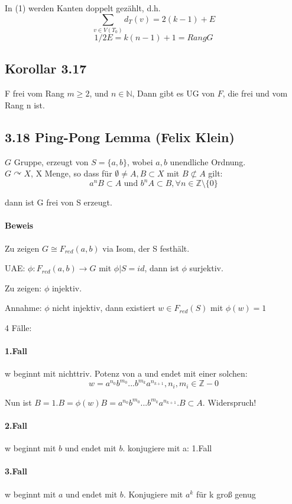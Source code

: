 \documentclass{article}
\newcommand{\N}{\mathbb{N}}
\newcommand{\Z}{\mathbb{Z}}
\begin{document}
In (1) werden Kanten doppelt gezählt, d.h.
\[\sum_{v\in V(T_0)}d_T(v) = 2(k-1) + E\]
\[1/2 E = k(n-1) + 1 = Rang G\]

\subsection{Korollar 3.17}
F frei vom Rang $m \geq 2$, und $n\in \N$, Dann gibt es UG von $F$, die frei und vom Rang n ist.

\subsection{3.18 Ping-Pong Lemma (Felix Klein)}
$G$ Gruppe, erzeugt von $S = \{a,b\}$, wobei $a,b$ unendliche Ordnung.\\
$G \curvearrowright X$, X Menge, so dass für $\emptyset \neq A, B \subset X$
mit $B \not \subset A$ gilt:
\[a^nB \subset A \text{ und } b^nA \subset B, \forall n \in \Z\setminus\{0\} \]

dann ist G frei von S erzeugt.

\paragraph{Beweis}
Zu zeigen $G \cong F_{red}(a,b)$ via Isom, der S festhält.

UAE:
$\phi : F_{red}(a,b) \longrightarrow G$ mit $\phi|S = id$, dann ist $\phi$ surjektiv.

Zu zeigen: $\phi$ injektiv.

Annahme: $\phi$ nicht injektiv, dann existiert $w\in F_{red}(S)$ mit $\phi(w) = 1$

4 Fälle: 

\paragraph{1.Fall}
w beginnt mit nichttriv. Potenz von a und endet mit einer solchen:
\[w = a^{n_0}b^{m_0}...b^{m_k}a^{n_{k+1}}, n_i, m_i \in \Z- 0 \]

Nun ist $B = 1.B = \phi(w)B = a^{n_0}b^{m_0}...b^{m_k}a^{n_{k+1}}.B \subset A$. Widerspruch!

\paragraph{2.Fall}
w beginnt mit $b$ und endet mit $b$. konjugiere mit a: 1.Fall

\paragraph{3.Fall}
w beginnt mit $a$ und endet mit $b$. Konjugiere mit $a^k$ für k groß genug
\end{document}
